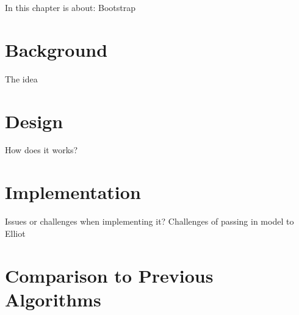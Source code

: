 In this chapter is about: Bootstrap

\section{Background}
The idea

\section{Design}
How does it works?

\section{Implementation}
Issues or challenges when implementing it?
Challenges of passing in model to Elliot


\section{Comparison to Previous Algorithms}